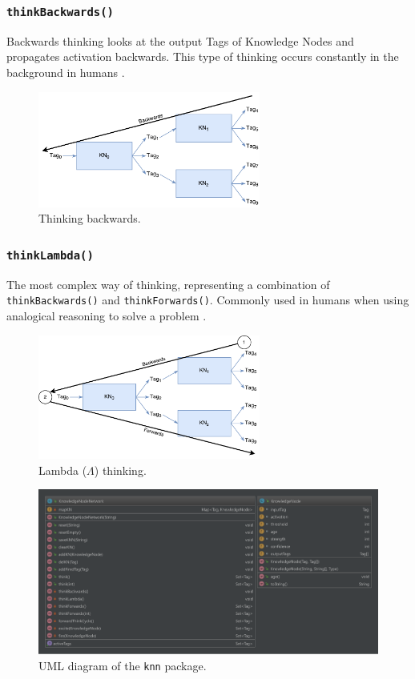 \documentclass{beamer}
\newcommand{\code}[1]{\texttt{#1}}
\begin{document}
	\begin{frame}
		\frametitle{\code{thinkBackwards()}}
		Backwards thinking looks at the output Tags of Knowledge Nodes and propagates activation backwards. This type of thinking occurs constantly in the background in humans .
		\begin{figure}
			\centering
			\includegraphics[width=0.65\textwidth]{figures/backwards_thinking.pdf}
			\caption
			{Thinking backwards.}
			\label{fig:backwards_thinking}
		\end{figure}
	\end{frame}
	
	\begin{frame}
		\frametitle{\code{thinkLambda()}}
		The most complex way of thinking, representing a combination of \code{thinkBackwards()} and \code{thinkForwards()}. Commonly used in humans when using analogical reasoning to solve a problem \footfullcite{vybihal-lambda}.
		\begin{figure}
			\centering
			\includegraphics[width=0.65\textwidth]{figures/lambda_thinking.pdf}
			\caption
			{Lambda ($\Lambda$) thinking.}
			\label{fig:lambda_thinking}
		\end{figure}
	\end{frame}
	
	\begin{frame}
		\begin{figure}
			\centering
			\includegraphics[width=\textwidth]{figures/uml_knn.pdf}
			\caption
			{UML diagram of the \code{knn} package.}
			\label{fig:uml_knn}
		\end{figure}
	\end{frame}
	
\end{document}
